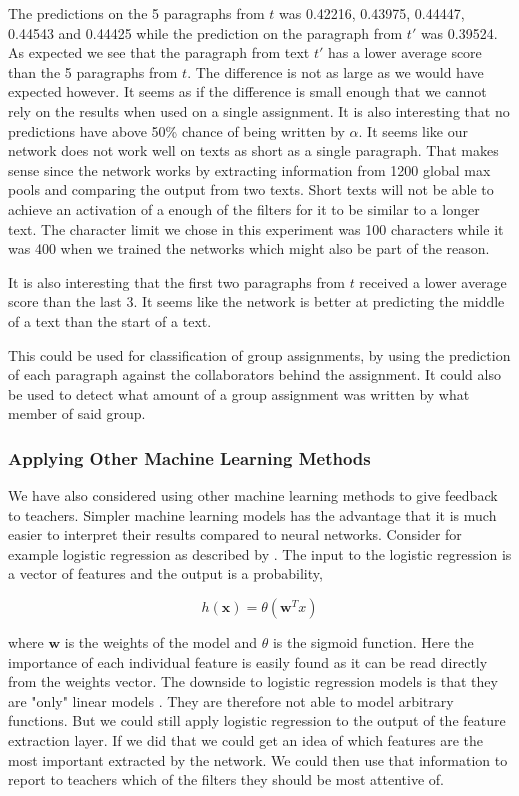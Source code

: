 The predictions on the 5 paragraphs from $t$ was 0.42216, 0.43975, 0.44447,
0.44543 and 0.44425 while the prediction on the paragraph from $t'$ was 0.39524.
As expected we see that the paragraph from text $t'$ has a lower average score
than the 5 paragraphs from $t$. The difference is not as large as we would
have expected however. It seems as if the difference is small enough that
we cannot rely on the results when used on a single assignment. It is also
interesting that no predictions have above 50\% chance of being written by
$\alpha$. It seems like our network does not work well on texts as short as
a single paragraph. That makes sense since the network works by extracting
information from 1200 global max pools and comparing the output from two texts.
Short texts will not be able to achieve an activation of a enough of the filters
for it to be similar to a longer text. The character limit we chose in this
experiment was 100 characters while it was 400 when we trained the networks
which might also be part of the reason.

It is also interesting that the first two paragraphs from $t$ received a lower
average score than the last 3. It seems like the network is better at predicting
the middle of a text than the start of a text.

This could be used for classification of group assignments, by using the
prediction of each paragraph against the collaborators behind the assignment. It
could also be used to detect what amount of a group assignment was written by
what member of said group.

\subsubsection{Applying Other Machine Learning Methods}

We have also considered using other machine learning methods to give feedback
to teachers. Simpler machine learning models has the advantage that it is much
easier to interpret their results compared to neural networks. Consider for
example logistic regression as described by \citet{Abu-Mostafa:2012:LD:2207825}.
The input to the logistic regression is a vector of features and the output is a
probability,

\begin{equation}
    h(\mathbf{x}) = \theta(\mathbf{w}^Tx)
\end{equation}

where $\mathbf{w}$ is the weights of the model and $\theta$ is the sigmoid
function. Here the importance of each individual feature is easily
found as it can be read directly from the weights vector. The downside
to logistic regression models is that they are "only" linear models
\citet{Abu-Mostafa:2012:LD:2207825}. They are therefore not able to model
arbitrary functions. But we could still apply logistic regression to the output
of the feature extraction layer. If we did that we could get an idea of which
features are the most important extracted by the network. We could then use
that information to report to teachers which of the filters they should be most
attentive of.

